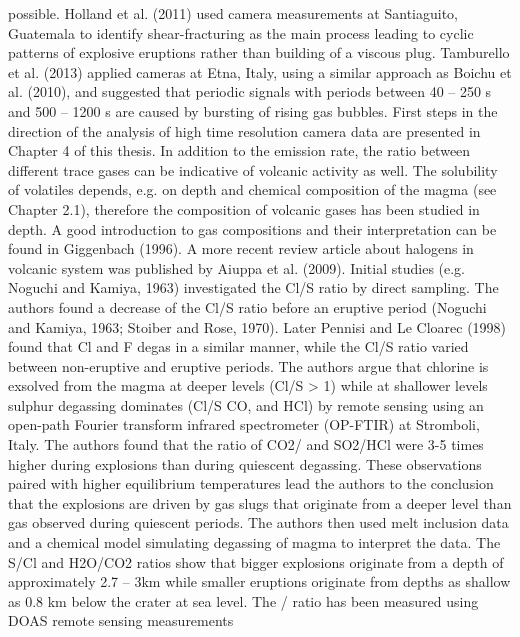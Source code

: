 \documentclass  [
  paper    = a4,
  BCOR     = 10mm,
  twoside,
  fontsize = 12pt,
  fleqn,
  toc      = bibnumbered,
  toc      = listofnumbered,
  numbers  = noendperiod,
  headings = normal,
  listof   = leveldown,
  version  = 3.03
]                                       {scrreprt}
\begin{document}
{	possible. Holland et al. (2011) used  camera measurements at Santiaguito,
	Guatemala to identify shear-fracturing as the main process leading to cyclic
	patterns of explosive eruptions rather than building of a viscous plug. Tamburello
	et al. (2013) applied  cameras at Etna, Italy, using a similar approach as
	Boichu et al. (2010), and suggested that periodic signals with periods between
	40 – 250 s and 500 – 1200 s are caused by bursting of rising gas bubbles. First
	steps in the direction of the analysis of high time resolution  camera data
	are presented in Chapter 4 of this thesis.
	In addition to the  emission rate, the ratio between different trace gases can
	be indicative of volcanic activity as well. The solubility of volatiles depends, e.g.
	on depth and chemical composition of the magma (see Chapter 2.1), therefore
	the composition of volcanic gases has been studied in depth. A good introduction
	to gas compositions and their interpretation can be found in Giggenbach (1996).
	A more recent review article about halogens in volcanic system was published by
	Aiuppa et al. (2009). Initial studies (e.g. Noguchi and Kamiya, 1963) investigated
	the Cl/S ratio by direct sampling. The authors found a decrease of the Cl/S
	ratio before an eruptive period (Noguchi and Kamiya, 1963; Stoiber and Rose,
	1970). Later Pennisi and Le Cloarec (1998) found that Cl and F degas in a
	similar manner, while the Cl/S ratio varied between non-eruptive and eruptive
	periods. The authors argue that chlorine is exsolved from the magma at deeper
	levels (Cl/S > 1) while at shallower levels sulphur degassing dominates (Cl/S
	CO,  and HCl) by remote sensing using an open-path Fourier transform
	infrared spectrometer (OP-FTIR) at Stromboli, Italy. The authors found that
	the ratio of CO2/ and SO2/HCl were 3-5 times higher during explosions than
	during quiescent degassing. These observations paired with higher equilibrium
	temperatures lead the authors to the conclusion that the explosions are driven by
	gas slugs that originate from a deeper level than gas observed during quiescent
	periods. The authors then used melt inclusion data and a chemical model
	simulating degassing of magma to interpret the data. The S/Cl and H2O/CO2
	ratios show that bigger explosions originate from a depth of approximately
	2.7 – 3km while smaller eruptions originate from depths as shallow as 0.8 km
	below the crater at sea level.
	The / ratio has been measured using DOAS remote sensing measurements
}
\end{document}
